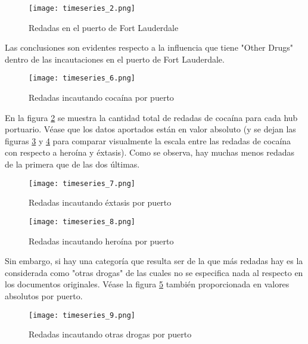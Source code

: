 \documentclass[12pt]{article}
\begin{document}
		\begin{figure}[H]
			\caption{\label{timeseries_2} Redadas en el puerto de Fort Lauderdale}
			\centering
			\hspace*{1cm}
			\texttt{[image: timeseries\_2.png]}
		\end{figure}
	
		Las conclusiones son evidentes respecto a la influencia que tiene "Other Drugs" dentro de las incautaciones en el puerto de Fort Lauderdale.
	
		\begin{figure}[H]
			\caption{\label{timeseries_6} Redadas incautando cocaína por puerto}
			\centering
			\hspace*{1cm}
			\texttt{[image: timeseries\_6.png]}
		\end{figure}
	
		En la figura \ref{timeseries_6} se muestra la cantidad total de redadas de cocaína para cada hub portuario. Véase que los datos aportados están en valor absoluto (y se dejan las figuras \ref{timeseries_7} y  \ref{timeseries_8} para comparar visualmente la escala entre las redadas de cocaína con respecto a heroína y éxtasis). Como se observa, hay muchas menos redadas de la primera que de las dos últimas.
		
		\begin{figure}[H]
			\caption{\label{timeseries_7} Redadas incautando éxtasis por puerto}
			\centering
			\hspace*{1cm}
			\texttt{[image: timeseries\_7.png]}
		\end{figure}
	
		\begin{figure}[H]
			\caption{\label{timeseries_8} Redadas incautando heroína por puerto}
			\centering
			\hspace*{1cm}
			\texttt{[image: timeseries\_8.png]}
		\end{figure}
	
		Sin embargo, si hay una categoría que resulta ser de la que más redadas hay es la considerada como "otras drogas" de las cuales no se especifica nada al respecto en los documentos originales. Véase la figura \ref{timeseries_9} también proporcionada en valores absolutos por puerto.
		
		\begin{figure}[H]
			\caption{\label{timeseries_9} Redadas incautando otras drogas por puerto}
			\centering
			\hspace*{1cm}
			\texttt{[image: timeseries\_9.png]}
		\end{figure}
	
\end{document}

